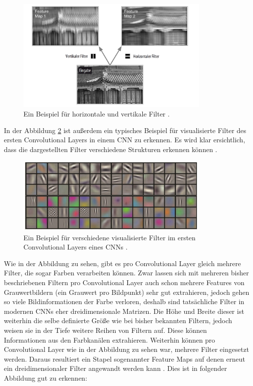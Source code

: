 \documentclass[11pt,bibliography=totocnumbered]{scrartcl}
\begin{document}
\begin{figure}[H]
	\centering
	\includegraphics[width=0.85\textwidth]{filter_example}
	\vspace*{-3mm}
	\caption[Beispiel für horizontale und vertikale Filter]{Ein Beispiel für horizontale und vertikale Filter \cite[S.364]{MACHINE_LEARNING}.}
	\label{fig:cnn_filter_example}
\end{figure}
\vspace*{-5mm}
In der Abbildung \ref{fig:cnn_filter_example_2} ist außerdem ein typisches Beispiel für visualisierte Filter des ersten Convolutional Layers in einem CNN zu erkennen. Es wird klar ersichtlich, dass die dargestellten Filter verschiedene Strukturen erkennen können \cite[S.132]{DEEP_LEARNING_REVOLUTION}.
\begin{figure}[H]
	\centering
	\includegraphics[width=0.85\textwidth]{cnn_filter}
	\vspace*{-3mm}
	\caption[Beispiel für verschiedene visualisierte Filter]{Ein Beispiel für verschiedene visualisierte Filter im ersten Convolutional Layers eines CNNs \cite[S.132]{DEEP_LEARNING_REVOLUTION}.}
	\label{fig:cnn_filter_example_2}
\end{figure}
\vspace*{-5mm} 
Wie in der Abbildung zu sehen, gibt es pro Convolutional Layer gleich mehrere Filter, die sogar Farben verarbeiten können. Zwar lassen sich mit mehreren bisher beschriebenen Filtern pro Convolutional Layer auch schon mehrere Features von Grauwertbildern (ein Grauwert pro Bildpunkt) sehr gut extrahieren, jedoch gehen so viele Bildinformationen der Farbe verloren, deshalb sind tatsächliche Filter in modernen CNNs eher dreidimensionale Matrizen. Die Höhe und Breite dieser ist weiterhin die selbe definierte Größe wie bei bisher bekannten Filtern, jedoch weisen sie in der Tiefe weitere Reihen von Filtern auf. Diese können Informationen aus den Farbkanälen extrahieren. Weiterhin können pro Convolutional Layer wie in der Abbildung zu sehen war, mehrere Filter eingesetzt werden. Daraus resultiert ein Stapel sogenannter Feature Maps auf denen erneut ein dreidimensionaler Filter angewandt werden kann \cite[S.364-365]{MACHINE_LEARNING}. Dies ist in folgender Abbildung gut zu erkennen:
\end{document}
